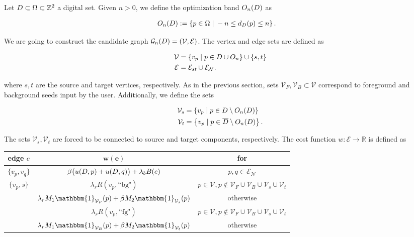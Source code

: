Let $D \subset \Omega \subset \mathbb{Z}^2$ a digital set. Given $n>0$, we define the optimization band $O_n(D)$ as

\begin{align*}
	O_n(D) &:=\left\{ p \in \Omega \; | \; -n \leq d_{D}(p) \leq n \right\}.
\end{align*}

We are going to construct the candidate graph $\mathcal{G}_n(D) = ( \mathcal{V},\mathcal{E})$. The vertex and edge sets are defined as 

\begin{align*}
	\mathcal{V} &= \{ v_p \; | \; p \in D \cup O_n \} \cup \{s,t\} \\
	\mathcal{E} &= \mathcal{E}_{st} \cup \mathcal{E}_\mathcal{N}.
\end{align*}

where $s,t$ are the source and target vertices, respectively. As in the previous section, sets $\mathcal{V}_F,\mathcal{V}_B \subset \mathcal{V}$ correspond to foreground and background seeds input by the user. Additionally, we define the sets

\begin{align*}
	\mathcal{V}_s &= \left\{ v_p \; | \; p \in D \setminus O_n(D) \right\}\\
	\mathcal{V}_t &= \left\{ v_p \; | \; p \in \overline{D} \setminus O_n(D) \right\}.
\end{align*}

The sets $\mathcal{V}_s, \mathcal{V}_t$ are forced to be connected to source and target components, respectively. The cost function $w:\mathcal{E}\rightarrow \mathbb{R}$ is defined as 

\begin{table}[H]
\centering
\setlength{\extrarowheight}{0.75em}
\begin{tabular}{|c|c|c|}
\hline
\textbf{edge} $e$ & $\mathbf{w(e)}$ & \textbf{for}\\
\hline
$\{v_p, v_q\}$ & $\beta \big(u(D,p) + u(D,q)\big) + \lambda_bB(e)$ & $p,q \in \mathcal{E}_{\mathcal{N}}$\\
\hline
\multirow{3}{*}{$\{v_p, s\}$} & $\lambda_r R(v_p,\text{``bg"})$ & $p \in \mathcal{V}, p \notin \mathcal{V}_F \cup \mathcal{V}_B \cup \mathcal{V}_s \cup \mathcal{V}_t$\\
& $\lambda_r M_1\mathbbm{1}_{\mathcal{V}_F}(p) + \beta M_2\mathbbm{1}_{\mathcal{V}_s}(p)$ & otherwise \\
\hline
\multirow{3}{*}{$\{v_p, t\}$} & $\lambda_r R(v_p,\text{``fg"})$ & $p \in \mathcal{V}, p \notin \mathcal{V}_F \cup \mathcal{V}_B \cup \mathcal{V}_s \cup \mathcal{V}_t$ \\
& $\lambda_r M_1\mathbbm{1}_{\mathcal{V}_B}(p) + \beta M_2\mathbbm{1}_{\mathcal{V}_t}(p)$ & otherwise \\
\hline
\end{tabular}
\end{table}

